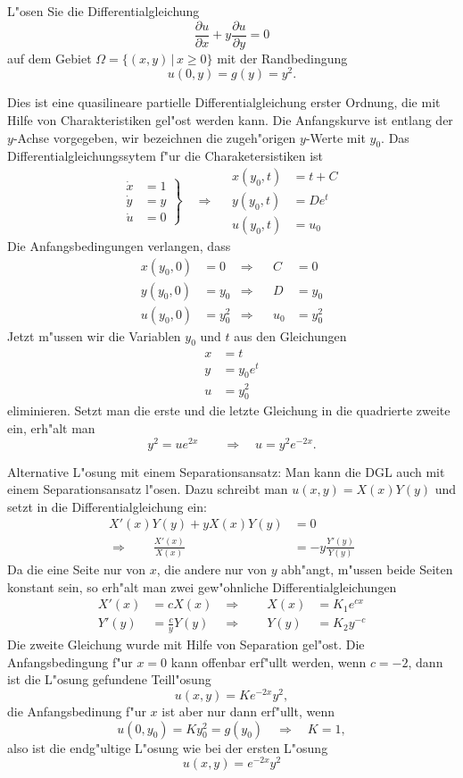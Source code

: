 L"osen Sie die Differentialgleichung
\[
\frac{\partial u}{\partial x}+y\frac{\partial u}{\partial y}=0
\]
auf dem Gebiet $\Omega=\{(x,y)\,|\, x\ge 0\}$ mit der Randbedingung
\[
u(0,y)=g(y)=y^2.
\]

\begin{loesung}
Dies ist eine quasilineare partielle Differentialgleichung
erster Ordnung, die mit Hilfe von Charakteristiken gel"ost werden
kann.
Die Anfangskurve ist entlang der $y$-Achse vorgegeben, wir bezeichnen
die zugeh"origen $y$-Werte mit $y_0$.
Das Differentialgleichungssytem f"ur die  Charaketersistiken ist
\[
\left.
\begin{aligned}
\dot x&=1\\
\dot y&=y\\
\dot u&=0
\end{aligned}
\right\}\quad\Rightarrow\quad
\begin{aligned}
x(y_0,t)&=t+C\\
y(y_0,t)&=De^t\\
u(y_0,t)&=u_0
\end{aligned}
\]
Die Anfangsbedingungen verlangen, dass
\begin{align*}
x(y_0,0)&=0&\Rightarrow&&C&=0\\
y(y_0,0)&=y_0&\Rightarrow&&D&=y_0\\
u(y_0,0)&=y_0^2&\Rightarrow&&u_0&=y_0^2
\end{align*}
Jetzt m"ussen wir die Variablen $y_0$ und $t$ aus den Gleichungen
\begin{align*}
x&=t\\
y&=y_0e^t\\
u&=y_0^2
\end{align*}
eliminieren. Setzt man die erste und die letzte Gleichung in die
quadrierte zweite ein, erh"alt man
\[
y^2=ue^{2x}\qquad\Rightarrow\quad u=y^2e^{-2x}.
\]

Alternative L"osung mit einem Separationsansatz: Man kann die DGL auch
mit einem Separationsansatz l"osen. Dazu schreibt man $u(x,y)=X(x)Y(y)$
und setzt in die Differentialgleichung ein:
\begin{align*}
X'(x)Y(y)+yX(x)Y(y)&=0\\
\Rightarrow\qquad \frac{X'(x)}{X(x)}&=-y\frac{Y'(y)}{Y(y)}
\end{align*}
Da die eine Seite nur von $x$, die andere nur von $y$ abh"angt, m"ussen
beide Seiten konstant sein, so erh"alt man zwei gew"ohnliche
Differentialgleichungen
\begin{align*}
X'(x)&=cX(x)&\Rightarrow\qquad X(x)&=K_1e^{cx}\\
Y'(y)&=\frac{c}{y}Y(y)&\Rightarrow\qquad Y(y)&=K_2y^{-c}
\end{align*}
Die zweite Gleichung wurde mit Hilfe von Separation gel"ost.
Die Anfangsbedingung f"ur $x=0$ kann offenbar erf"ullt werden,
wenn $c=-2$, dann ist die L"osung gefundene Teill"osung
\[
u(x,y)=Ke^{-2x}y^2,
\]
die Anfangsbedinung f"ur $x$ ist aber nur dann erf"ullt, wenn
\[
u(0,y_0)=Ky_0^2=g(y_0)\quad\Rightarrow\quad K=1,
\]
also ist die endg"ultige L"osung wie bei der ersten L"osung
\[
u(x,y)=e^{-2x}y^2
\]
\end{loesung}
